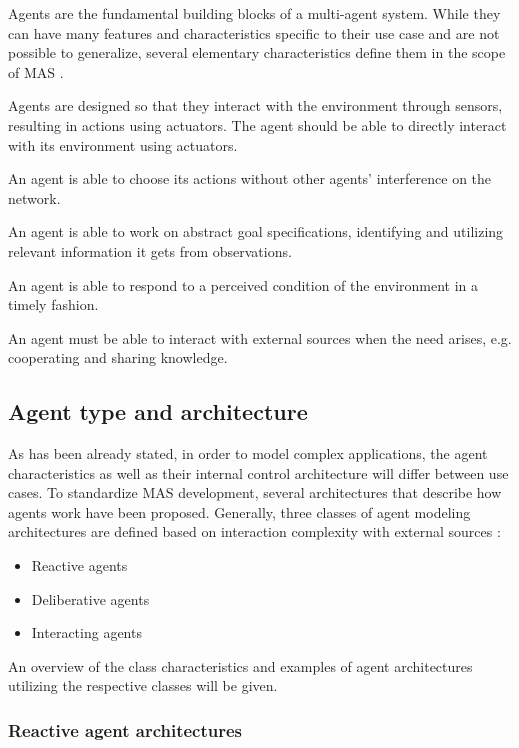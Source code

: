 \documentclass[0main.tex]{subfiles}
\begin{document}
Agents are the fundamental building blocks of a multi-agent system. While they can have many
features and characteristics specific to their use case and are not possible to generalize,
several elementary characteristics define them in the scope of MAS
\cite{ParasumannaGokulan2010}.

Agents are designed so that they interact with the environment through sensors,
resulting in actions using actuators.  The agent should be able to directly interact with its
environment using actuators.

An agent is able to choose its actions without other agents' interference on the network.

An agent is able to work on abstract goal specifications, identifying and utilizing relevant information it gets from observations.

An agent is able to respond to a perceived condition of the environment in a timely fashion.

An agent must be able to interact with external sources when the need arises, e.g. cooperating
and sharing knowledge.

\subsection{Agent type and architecture}

As has been already stated, in order to model complex applications, the agent characteristics as
well as their internal control architecture will differ between use cases. To standardize
MAS development, several architectures that describe how agents work have been proposed. Generally,
three classes of agent modeling architectures are defined based on interaction
complexity with external sources \cite{Anthony2014}:

\begin{itemize}
    \item Reactive agents
    \item Deliberative agents
    \item Interacting agents
\end{itemize}

An overview of the class characteristics and examples of agent architectures utilizing
the respective classes will be given.

\subsubsection{Reactive agent architectures}
\end{document}
